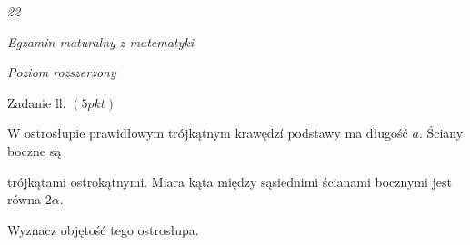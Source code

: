 \documentclass[a4paper,12pt]{article}
\begin{document}
{\it 22}

{\it Egzamin maturalny z matematyki}

{\it Poziom rozszerzony}

Zadanie ll. $(5pkt)$

$\mathrm{W}$ ostrosłupie prawidłowym trójkątnym krawędzí podstawy ma długość $a$. Ściany boczne są

trójkątami ostrokątnymi. Miara kąta między sąsiednimi ścianami bocznymi jest równa $2\alpha.$

Wyznacz objętość tego ostrosłupa.
\end{document}
